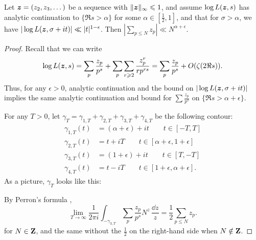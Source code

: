 \begin{theorem}\label{thm:RH->bound}
Let ${\boldsymbol z}=(z_2,z_3,\dots)$ be a sequence with $\|{\boldsymbol z}\|_\infty\leqslant 1$, and 
assume $\log L({\boldsymbol z},s)$ has analytic continuation to $\{\Re s>\alpha\}$ for some 
$\alpha\in \left[\frac 1 2,1\right]$, and that for $\sigma>\alpha$, we have 
$|\log L({\boldsymbol z},\sigma+i t)| \ll |t|^{1-\epsilon}$. Then 
$|\sum_{p\leqslant N} z_p| \ll N^{\alpha+\epsilon}$. 
\end{theorem}
\begin{proof}
Recall that we can write 
\[
	\log L({\boldsymbol z},s) = \sum_p \frac{z_p}{p^s} + \sum_p \sum_{r\geqslant 2} \frac{z_p^r}{r p^{r s}} = \sum_p \frac{z_p}{p^s} + O(\zeta(2 \Re s)) .
\]
Thus, for any $\epsilon>0$, analytic continuation and the bound on 
$|\log L({\boldsymbol z},\sigma+i t)|$ implies the same analytic continuation and bound for 
$\sum \frac{z_p}{p^s}$ on $\{\Re s>\alpha+\epsilon\}$. 

For any $T>0$, let 
$\gamma_T = \gamma_{1,T} + \gamma_{2,T} + \gamma_{3,T} + \gamma_{4,T}$ be the 
following contour: 
\begin{align*}
	\gamma_{1,T}(t) &= (\alpha+\epsilon)+i t\qquad t\in [-T,T] \\
	\gamma_{2,T}(t) &= t+i T \qquad t\in [\alpha+\epsilon,1+\epsilon] \\
	\gamma_{3,T}(t) &= (1+\epsilon) + i t \qquad t\in [T,-T] \\
	\gamma_{4,T}(t) &= t - i T \qquad t\in [1+\epsilon,\alpha+\epsilon] .
\end{align*}
As a picture, $\gamma_T$ looks like this: 
\begin{center}
\end{center}
By Perron's formula \cite[Th.~11.18]{apostol-1976}, 
\[
	\lim_{T\to \infty} \frac{1}{2\pi i} \int_{-\gamma_{3,T}} \sum_p \frac{z_p}{p^s} N^z\, \frac{\dd z}{z} = \frac 1 2 \sum_{p\leqslant N} z_p .
\]
for $N\in \mathbf{Z}$, and the same without the $\frac 1 2$ on the right-hand side 
when $N\notin \mathbf{Z}$. 


\end{proof}
